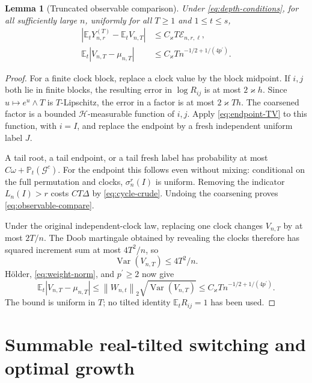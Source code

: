\documentclass[11pt]{article}
\numberwithin{equation}{section}
\newtheorem{lemma}[theorem]{Lemma}
\theoremstyle{definition}
\theoremstyle{remark}
\newcommand{\E}{\mathbb E}
\newcommand{\Pp}{\mathbb P}
\newcommand{\Var}{\operatorname{Var}}
\newcommand{\cH}{\mathcal H}
\newcommand{\cG}{\mathcal G}
\newcommand{\pdual}{{p^{\prime}}}
\newcommand{\norm}[1]{\left\|#1\right\|}
\newcommand{\abs}[1]{\left|#1\right|}
\begin{document}
\begin{lemma}[Truncated observable comparison]\label{lem:truncated}
Under \eqref{eq:depth-conditions}, for all sufficiently large $n$, uniformly for all $T\ge1$ and $1\le t\le s$,
\begin{align}
 \abs{\E_tY_{n,r}^{(T)}-\E_tV_{n,T}}
 &\le C_\varkappa T\mathcal E_{n,r,\ell},\label{eq:observable-compare}\\
 \E_t|V_{n,T}-\mu_{n,T}|
 &\le C_\varkappa Tn^{-1/2+1/(4\pdual)}.\label{eq:tilted-concentration}
\end{align}
\end{lemma}
\begin{proof}
For a finite clock block, replace a clock value by the block midpoint. If $i,j$ both lie in finite blocks, the resulting error in $\log R_{ij}$ is at most $2\varkappa h$. Since $u\mapsto e^u\wedge T$ is $T$-Lipschitz, the error in a factor is at most $2\varkappa Th$. The coarsened factor is a bounded $\cH$-measurable function of $i,j$. Apply \eqref{eq:endpoint-TV} to this function, with $i=I$, and replace the endpoint by a fresh independent uniform label $J$.

A tail root, a tail endpoint, or a tail fresh label has probability at most $C\omega+\Pp_t(\cG^c)$. For the endpoint this follows even without mixing: conditional on the full permutation and clocks, $\sigma_n^r(I)$ is uniform. Removing the indicator $L_n(I)>r$ costs $CT\Delta$ by \eqref{eq:cycle-crude}. Undoing the coarsening proves \eqref{eq:observable-compare}.

Under the original independent-clock law, replacing one clock changes $V_{n,T}$ by at most $2T/n$. The Doob martingale obtained by revealing the clocks therefore has squared increment sum at most $4T^2/n$, so
\[
 \Var(V_{n,T})\le4T^2/n.
\]
H\"older, \eqref{eq:weight-norm}, and $\pdual\ge2$ now give
\[
 \E_t|V_{n,T}-\mu_{n,T}|
 \le\norm{W_{n,t}}_2\sqrt{\Var(V_{n,T})}
 \le C_\varkappa Tn^{-1/2+1/(4\pdual)}.
\]
The bound is uniform in $T$; no tilted identity $\E_tR_{ij}=1$ has been used.
\end{proof}

\section{Summable real-tilted switching and optimal growth}\label{sec:real}
\end{document}
